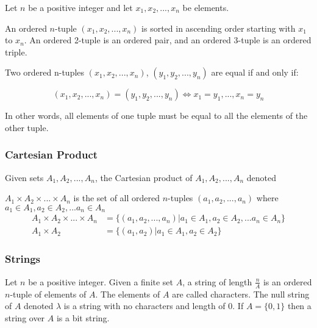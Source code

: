 \documentclass[11pt]{article}
\begin{document}
\begin{definition}[Tuples]\label{def:tuple}
    Let $n$ be a positive integer and let $x_1, x_2, ... , x_n$ be elements.

    An ordered $n$-tuple $(x_1, x_2, ... , x_n)$ is sorted in ascending order
    starting with $x_1$ to $x_n$. An ordered 2-tuple is an ordered pair,
    and an ordered 3-tuple is an ordered triple.
\end{definition}

\begin{definition}\label{def:tuple-eq}
    Two ordered n-tuples $(x_1, x_2, ..., x_n)$, $(y_1, y_2, ..., y_n)$
    are equal if and only if:

    \begin{equation}
        (x_1, x_2, ..., x_n) = (y_1, y_2, ..., y_n) \iff x_1 = y_1, ..., x_n = y_n
    \end{equation}
\end{definition}

In other words, all elements of one tuple must be equal to all the elements of the other tuple.

\subsubsection{Cartesian Product}

\begin{definition}\label{def:cartesian-product}
    Given sets $A_1, A_2, ..., A_n$, the Cartesian product of $A_1, A_2, ..., A_n$
    denoted

    $A_1 \times A_2 \times ... \times A_n$ is the set of all ordered $n$-tuples
    $(a_1, a_2, ..., a_n)$ where $a_1 \in A_1, a_2 \in A_2, ... a_n \in A_n$
    \begin{equation}
        \begin{aligned}
            A_1 \times A_2 \times ... \times A_n &= \{ (a_1, a_2, ..., a_n) | a_1 \in A_1, a_2 \in A_2, ... a_n \in A_n \} \\
            A_1 \times A_2 &= \{ (a_1, a_2) | a_1 \in A_1, a_2 \in A_2 \}
        \end{aligned}
    \end{equation}
\end{definition}

\subsubsection{Strings}
\begin{definition}[Strings]\label{def:string}
    Let $n$ be a positive integer. Given a finite set $A$, a string
    of length $\frac{n}{A}$ is an ordered $n$-tuple of elements of $A$.
    The elements of $A$ are called characters. The null string of $A$
    denoted $\lambda$ is a string with no characters and length of $0$.
    If $A = \{0, 1\}$ then a string over $A$ is a bit string.
\end{definition}
\end{document}
